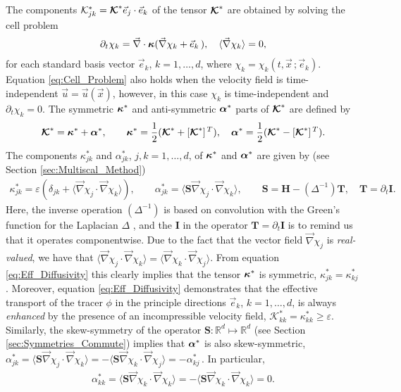 \documentclass[11pt]{amsart}
\newcommand{\Tb}{\mathbf{T}}
\newcommand{\Hb}{\mathbf{H}}
\newcommand{\Ib}{\mathbf{I}}
\newcommand{\Sb}{\mathbf{S}}
\newcommand{\Kc}{\mathcal{K}}
\newcommand\Kbc{\mbox{\boldmath${\mathcal{K}}$}}
\newcommand\balpha{\mbox{\boldmath${\alpha}$}}
\newcommand\bkappa{\mbox{\boldmath${\kappa}$}}
\begin{document}
The components $\Kc^*_{jk}=\Kbc^*\vec{e}_j\cdot\vec{e}_k$ of the tensor
$\Kbc^*$ are obtained by solving the cell problem
\cite{Fannjiang:SIAM_JAM:333} 
% 
\begin{align}\label{eq:Cell_Problem}
  \partial_t\chi_k=\vec{\nabla}\cdot\bkappa(\vec{\nabla}\chi_k+\vec{e}_k\,), \quad
  \langle\vec{\nabla}\chi_k\rangle=0,
\end{align}
%
for each standard basis vector $\vec{e}_k$, $k=1,\ldots,d$, where
$\chi_k=\chi_k(t,\vec{x}\,;\vec{e}_k)$. Equation \eqref{eq:Cell_Problem}
also holds \cite{Fannjiang:SIAM_JAM:333} when the velocity field is
time-independent $\vec{u}=\vec{u}(\vec{x})$, however, in this case
$\chi_k$ is time-independent and $\partial_t\chi_k=0$. The symmetric $\bkappa^*$ and
anti-symmetric $\balpha^*$ parts of $\Kbc^*$ are defined by
%
\begin{align}\label{eq:Symm_Anti-Symm}
  \Kbc^*=\bkappa^*+\balpha^*,\qquad
  \bkappa^*=\frac{1}{2}(\Kbc^*+[\Kbc^*]^{\,T}), \quad
  \balpha^*=\frac{1}{2}(\Kbc^*-[\Kbc^*]^{\,T}).
\end{align}
%
The components $\kappa^*_{jk}$ and $\alpha^*_{jk}$, $j,k=1,\ldots,d$, of $\bkappa^*$
and $\balpha^*$ are given by (see Section \ref{sec:Multiscal_Method}) 
%
\begin{align}\label{eq:Eff_Diffusivity}
 \kappa^*_{jk}=\varepsilon(\delta_{jk}+\langle\vec{\nabla}\chi_j\cdot\vec{\nabla}\chi_k\rangle), \qquad
 \alpha^*_{jk}=\langle\Sb\vec{\nabla}\chi_j\cdot\vec{\nabla}\chi_k\rangle, \qquad
 \Sb=\Hb-(\Delta^{-1})\Tb, \quad \Tb=\partial_t\Ib.
\end{align}
%
Here, the inverse operation $(\Delta^{-1})$ is based on convolution with the
Green's function for the Laplacian $\Delta$ \cite{Stakgold:BVP:2000}, and
the $\Ib$ in the operator $\Tb=\partial_t\Ib$ is to remind us that it
operates componentwise. Due to the fact that the vector field
$\vec{\nabla}\chi_j$ is \emph{real-valued}, we have that
$\langle\vec{\nabla}\chi_j\cdot\vec{\nabla}\chi_k\rangle=\langle\vec{\nabla}\chi_k\cdot\vec{\nabla}\chi_j\rangle$. From equation
\eqref{eq:Eff_Diffusivity} this clearly implies that the tensor   
$\bkappa^*$ is symmetric, $\kappa^*_{jk}=\kappa^*_{kj}$. Moreover, equation
\eqref{eq:Eff_Diffusivity} demonstrates that the effective transport
of the tracer $\phi$ in the principle directions $\vec{e}_k$, $k=1,\ldots,d$,
is always \emph{enhanced} by the presence of an incompressible velocity
field, $\Kc^*_{kk}=\kappa^*_{kk}\geq\varepsilon$. Similarly, the skew-symmetry of the
operator $\Sb:\mathbb{R}^d\mapsto\mathbb{R}^d$ (see Section
\ref{sec:Symmetries_Commute}) implies that $\balpha^*$ is also
skew-symmetric,
$\alpha^*_{jk}=\langle\Sb\vec{\nabla}\chi_j\cdot\vec{\nabla}\chi_k\rangle=-\langle\Sb\vec{\nabla}\chi_k\cdot\vec{\nabla}\chi_j\rangle=-\alpha^*_{kj}\,$. In
particular,    
%
\begin{align}\label{eq:Sb_Skew}
  \alpha^*_{kk}=\langle\Sb\vec{\nabla}\chi_k\cdot\vec{\nabla}\chi_k\rangle=-\langle\Sb\vec{\nabla}\chi_k\cdot\vec{\nabla}\chi_k\rangle=0.  
\end{align}
%
  
\end{document}
